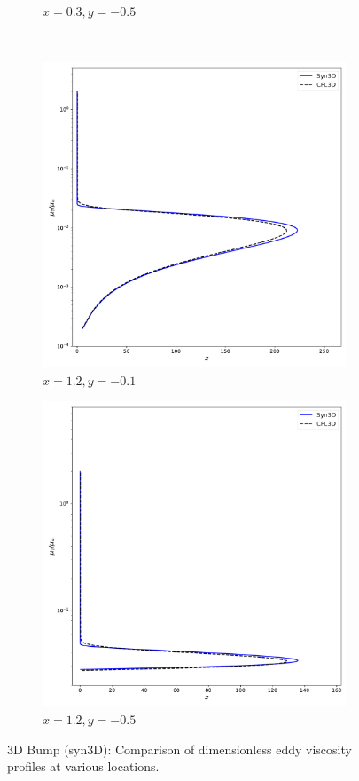 \begin{figure}[ht!]
\begin{subfigure}{.45\textwidth}
  \caption{$x=0.3, y=-0.5$}
  \label{fig:syn3dbumpbad}
\end{subfigure}%
\\
\begin{subfigure}{.45\textwidth}
  \centering
  \includegraphics[width=1.0\textwidth]{figs/3dbump/x12y01REV.pdf}
  \caption{$x=1.2, y=-0.1$}
\end{subfigure}%
\begin{subfigure}{.45\textwidth}
  \centering
  \includegraphics[width=1.0\textwidth]{figs/3dbump/x12y05REV.pdf}
  \caption{$x=1.2, y=-0.5$}
\end{subfigure}%
\caption{3D Bump (syn3D): Comparison of dimensionless eddy viscosity profiles at various locations.}
\label{fig:syn3dbumpmut}
\end{figure}

